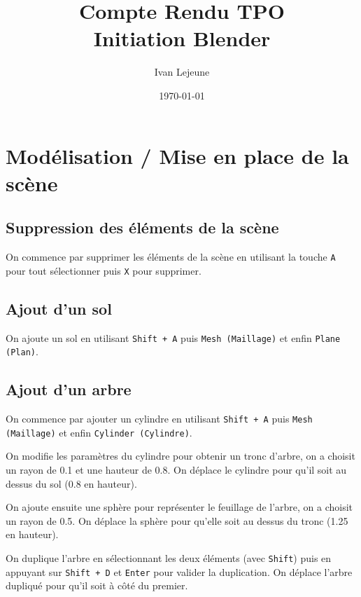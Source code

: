 \documentclass[french,a4paper,10pt]{article}
\title{Compte Rendu TPO\\Initiation Blender}
\author{Ivan Lejeune}
\date{\today}
\begin{document}
	\maketitle

	\tableofcontents

	\newpage
	\section{Modélisation / Mise en place de la scène}\label{sec:1}

	\subsection{Suppression des éléments de la scène}\label{subsec:1.1}

    On commence par supprimer les éléments de la scène en utilisant la touche \texttt{A} pour tout sélectionner puis
    \texttt{X} pour supprimer.

    \subsection{Ajout d'un sol}\label{subsec:1.2}

    On ajoute un sol en utilisant \texttt{Shift + A} puis \texttt{Mesh (Maillage)} et enfin \texttt{Plane (Plan)}.

    \subsection{Ajout d'un arbre}\label{subsec:1.3}

    On commence par ajouter un cylindre en utilisant \texttt{Shift + A} puis \texttt{Mesh (Maillage)} et enfin
    \texttt{Cylinder (Cylindre)}.

    On modifie les paramètres du cylindre pour obtenir un tronc d'arbre, on a choisit un rayon de 0.1 et une hauteur de
    0.8. On déplace le cylindre pour qu'il soit au dessus du sol (0.8 en hauteur).

    On ajoute ensuite une sphère pour représenter le feuillage de l'arbre, on a choisit un rayon de 0.5. On déplace la
    sphère pour qu'elle soit au dessus du tronc (1.25 en hauteur).

    On duplique l'arbre en sélectionnant les deux éléments (avec \texttt{Shift}) puis en appuyant sur \texttt{Shift + D}
    et \texttt{Enter} pour valider la duplication. On déplace l'arbre dupliqué pour qu'il soit à côté du premier.
\end{document}
